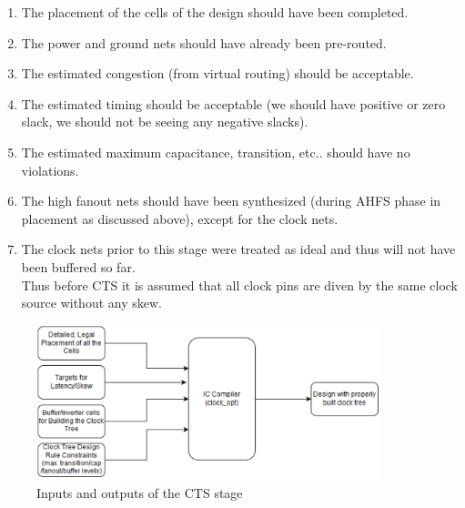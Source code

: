\documentclass[../main.tex]{subfiles}
\begin{document}
\begin{enumerate}
\item The placement of the cells of the design should have been completed. 
\item The power and ground nets should have already been pre-routed. 
\item The estimated congestion (from virtual routing) should be acceptable. 
\item The estimated timing should be acceptable (we should have positive or zero slack, we should not be seeing any negative slacks). 
\item The estimated maximum capacitance, transition, etc.. should have no violations. 
\item The high fanout nets should have been synthesized (during AHFS phase in placement as 
discussed above), except for the clock nets. 
\item  The clock nets prior to this stage were treated as ideal and thus will not have been buffered 
so far.\\
Thus before CTS it is assumed that all clock pins are diven by the same clock source 
without any skew.
\end{enumerate}

\begin{figure}[h]
\centering
\includegraphics[width=10cm]{diagrams/IO_CTS.PNG}
\caption{ Inputs and outputs of the CTS stage}
\label{fig:IO_CTS}
\end{figure}
\end{document}

